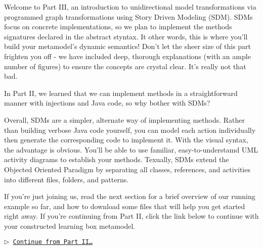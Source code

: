 \genHeader
{}

Welcome to Part III, an introduction to unidirectional model transformations via programmed graph transformations using Story Driven Modeling (SDM).
SDMs focus on concrete implementations, so we plan to implement the methods signatures declared in the abstract styntax. It other words, this is where you'll
build your metamodel's dynamic semantics! Don't let the sheer size of this part frighten you off - we have included deep, thorough explanations (with an ample
number of figures) to ensure the concepts are crystal clear. It's really not that bad.

In Part II, we learned that we can implement methods in a straightforward manner with injections and Java code, so why bother with SDMs? 

Overall, SDMs are a simpler, alternate way of implementing methods. Rather than building verbose Java code yourself, you can model each action individually then
generate the corresponding code to implement it. With the visual syntax, the advantage is obvious. You'll be able to use familiar, easy-to-understamd UML
activity diagrams to establish your methods. Texually, SDMs extend the Objected Oriented Paradigm by separating all classes, references, and activities into
different files, folders, and patterns.

If you're just joining us, read the next section for a brief overview of our running example so far, and how to download some files that will help you get
started right away. If you're continuing from Part II, click the link below to continue with your constructed learning box metamodel.

\begin{center}\texttt{$\triangleright$ \hyperlink{explanation}{Continue from Part II\ldots}}\end{center}
